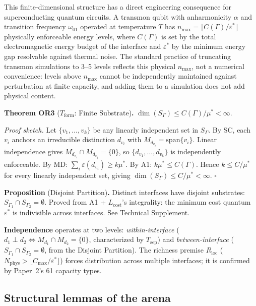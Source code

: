 \documentclass[11pt]{article}
\theoremstyle{remark}
\begin{document}
This finite-dimensional structure has a direct engineering consequence for superconducting quantum circuits.  A transmon qubit with anharmonicity $\alpha$ and transition frequency $\omega_{01}$ operated at temperature $T$ has $n_{\mathrm{max}} = \lfloor C(\Gamma)/\varepsilon^* \rfloor$ physically enforceable energy levels, where $C(\Gamma)$ is set by the total electromagnetic energy budget of the interface and $\varepsilon^*$ by the minimum energy gap resolvable against thermal noise.  The standard practice of truncating transmon simulations to 3--5 levels reflects this physical $n_{\mathrm{max}}$, not a numerical convenience: levels above $n_{\mathrm{max}}$ cannot be independently maintained against perturbation at finite capacity, and adding them to a simulation does not add physical content.

\smallskip\noindent\textbf{Theorem OR3} ($T_{\mathrm{form}}$: Finite Substrate)\textbf{.}  $\dim(S_\Gamma) \le C(\Gamma)/\mu^* < \infty$.

\smallskip\noindent\textit{Proof sketch.}  Let $\{v_1, \ldots, v_k\}$ be any linearly independent set in $S_\Gamma$.  By SC, each $v_i$ anchors an irreducible distinction $d_{v_i}$ with $M_{d_{v_i}} = \mathrm{span}\{v_i\}$.  Linear independence gives $M_{d_{v_i}} \cap M_{d_{v_j}} = \{0\}$, so $\{d_{v_1}, \ldots, d_{v_k}\}$ is independently enforceable.  By MD: $\sum_i \varepsilon(d_{v_i}) \ge k\mu^*$.  By A1: $k\mu^* \le C(\Gamma)$.  Hence $k \le C/\mu^*$ for every linearly independent set, giving $\dim(S_\Gamma) \le C/\mu^* < \infty$.  \hfill$\square$

\smallskip\noindent\textbf{Proposition} (Disjoint Partition)\textbf{.}\label{prop:disjoint_partition}  Distinct interfaces have disjoint substrates: $S_{\Gamma_1} \cap S_{\Gamma_2} = \emptyset$.  Proved from A1 + $L_{\mathrm{cost}}$'s integrality: the minimum cost quantum $\varepsilon^*$ is indivisible across interfaces.  See Technical Supplement.

\smallskip\noindent\textbf{Independence}\label{def:independence} operates at two levels: \emph{within-interface} ($d_1 \perp d_2 \Leftrightarrow M_{d_1} \cap M_{d_2} = \{0\}$, characterized by $T_{\mathrm{sep}}$) and \emph{between-interface} ($S_{\Gamma_1} \cap S_{\Gamma_2} = \emptyset$, from the Disjoint Partition).  The richness premise $R_{\mathrm{loc}}$ ($N_{\mathrm{phys}} > \lfloor C_{\max}/\varepsilon^* \rfloor$) forces distribution across multiple interfaces; it is confirmed by Paper~2's 61 capacity types.


\subsection{Structural lemmas of the arena}
\label{sec:lemmas}
\end{document}
